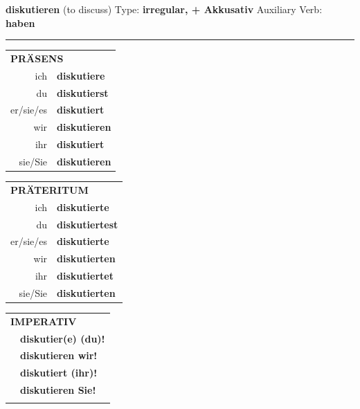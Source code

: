 \documentclass[10pt,a4paper]{revtex4-2}
\begin{document}
\begin{verbbox-acc}
    {\Large \bf diskutieren} (to discuss) \hfill Type: \textbf{irregular, + Akkusativ} \hfill Auxiliary Verb: \textbf{haben} 
    
     \vspace{5pt}

    \hrule
    
    \vspace{5pt}

  \begin{tabular}{rl}
     \multicolumn{2}{l}{\textbf{PRÄSENS} }\\
    ich & \textbf{diskutiere}\\
    du & \textbf{diskutierst}\\
    er/sie/es & \textbf{diskutiert}\\
    wir & \textbf{diskutieren}\\
    ihr & \textbf{diskutiert}\\
    sie/Sie & \textbf{diskutieren}\\
  \end{tabular}
  \hfill
     \begin{tabular}{rl}
    \multicolumn{2}{l}{\textbf{PRÄTERITUM} }\\
    ich & \textbf{diskutierte}\\
    du & \textbf{diskutiertest}\\
    er/sie/es & \textbf{diskutierte}\\
    wir & \textbf{diskutierten}\\
    ihr & \textbf{diskutiertet}\\
    sie/Sie & \textbf{diskutierten}\\
  \end{tabular}
  \hfill
  \begin{tabular}{rl}
     \multicolumn{2}{l}{\textbf{IMPERATIV} }\\
   & \textbf{diskutier(e) (du)!}\\
   & \textbf{diskutieren wir!}\\
   & \textbf{diskutiert (ihr)!}\\
   & \textbf{diskutieren Sie!}\\
   & \vspace{10pt}
  \end{tabular}

    \vspace{10pt}


\end{verbbox-acc}
\end{document}
